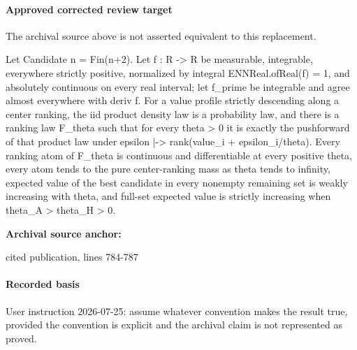 \documentclass[10pt]{article}
\begin{document}
\paragraph{Approved corrected review target}
The archival source above is not asserted equivalent to this replacement.
\begin{ReviewVerbatim}
Let Candidate n = Fin(n+2). Let f : R -> R be measurable, integrable, everywhere strictly positive, normalized by integral ENNReal.ofReal(f) = 1, and absolutely continuous on every real interval; let f_prime be integrable and agree almost everywhere with deriv f. For a value profile strictly descending along a center ranking, the iid product density law is a probability law, and there is a ranking law F_theta such that for every theta > 0 it is exactly the pushforward of that product law under epsilon |-> rank(value_i + epsilon_i/theta). Every ranking atom of F_theta is continuous and differentiable at every positive theta, every atom tends to the pure center-ranking mass as theta tends to infinity, expected value of the best candidate in every nonempty remaining set is weakly increasing with theta, and full-set expected value is strictly increasing when theta_A > theta_H > 0.
\end{ReviewVerbatim}

\textbf{Archival source anchor:} {\footnotesize\raggedright cited publication, lines 784-\allowbreak{}787\par}
\paragraph{Recorded basis}
User instruction 2026-\allowbreak{}07-\allowbreak{}25:\allowbreak{} assume whatever convention makes the result true, provided the convention is explicit and the archival claim is not represented as proved.\allowbreak{}
\end{document}
